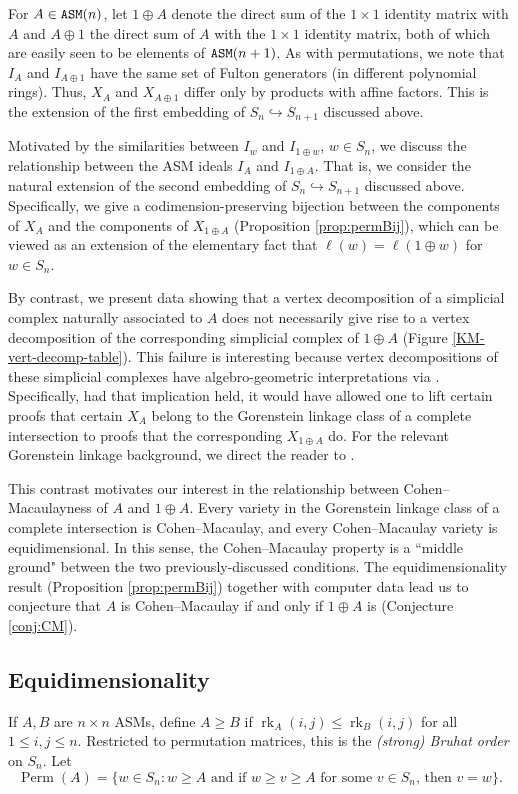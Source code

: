 \documentclass[12 pt]{amsart}
\DeclareMathOperator{\rk}{rk}
\DeclareMathOperator{\asm}{\tt ASM}
\DeclareMathOperator{\Perm}{Perm}
\theoremstyle{plain}
\theoremstyle{definition}
\theoremstyle{remark}
\begin{document}
For $A \in \asm(n)$, let $1 \oplus A$ denote the direct sum of the $1 \times 1$ identity matrix with $A$ and $A \oplus 1$ the direct sum of $A$ with the $1 \times 1$ identity matrix, both of which are easily seen to be elements of $\asm(n+1)$.  As with permutations, we note that $I_A$ and $I_{A \oplus 1}$ have the same set of Fulton generators (in different polynomial rings).  Thus, $X_A$ and $X_{A \oplus 1}$ differ only by products with affine factors.  This is the extension of the first embedding of $S_n \hookrightarrow S_{n+1}$ discussed above.  

Motivated by the similarities between $I_w$ and $I_{1 \oplus w}$, $w \in S_n$, we discuss the relationship between the ASM ideals $I_A$ and $I_{1 \oplus A}$.  That is, we consider the natural extension of the second embedding of $S_n \hookrightarrow S_{n+1}$ discussed above.  Specifically, we give a codimension-preserving bijection between the components of $X_A$ and the components of $X_{1 \oplus A}$ (Proposition \ref{prop:permBij}), which can be viewed as an extension of the elementary fact that $\ell(w) = \ell(1 \oplus w)$ for $w \in S_n$.  

By contrast, we present data showing that a vertex decomposition of a simplicial complex naturally associated to $A$ does not necessarily give rise to a vertex decomposition of the corresponding simplicial complex of $1\oplus A$ (Figure \ref{KM-vert-decomp-table}).  This failure is interesting because vertex decompositions of these simplicial complexes have algebro-geometric interpretations via \cite{KR21}.  Specifically, had that implication held, it would have allowed one to lift certain proofs that certain $X_A$ belong to the Gorenstein linkage class of a complete intersection to proofs that the corresponding $X_{1 \oplus A}$ do.  For the relevant Gorenstein linkage background, we direct the reader to \cite{NR08, KR21}.

This contrast motivates our interest in the relationship between Cohen--Macaulayness of $A$ and $1 \oplus A$.   Every variety in the Gorenstein linkage class of a complete intersection is Cohen--Macaulay, and every Cohen--Macaulay variety is equidimensional.  In this sense, the Cohen--Macaulay property is a ``middle ground" between the two previously-discussed conditions.  The equidimensionality result (Proposition \ref{prop:permBij}) together with computer data lead us to conjecture that $A$ is Cohen--Macaulay if and only if $1 \oplus A$ is (Conjecture \ref{conj:CM}).  

\subsection{Equidimensionality}
If $A,B$ are $n \times n$ ASMs, define $A \ge B$ if $\rk_A(i,j) \le \rk_B(i,j)$ for all $1 \le i,j \le n$.
Restricted to permutation matrices, this is the {\it (strong) Bruhat order} on $S_n$.
Let
\[
    \Perm(A) = \{w \in S_n : \text{$w \ge A$ and if $w \ge v \ge A$ for some $v \in S_n$, then $v=w$}\}.
\]
\end{document}
